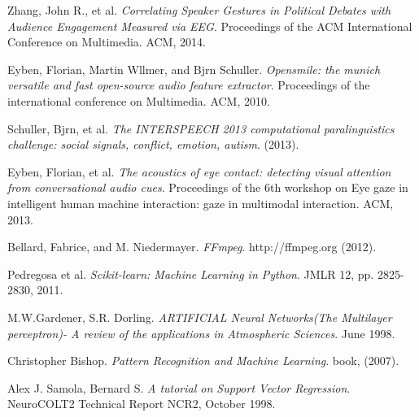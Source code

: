 \begin{thebibliography}{9}
Zhang, John R., et al.
\textit{Correlating Speaker Gestures in Political Debates with Audience Engagement Measured via EEG}. 
Proceedings of the ACM International Conference on Multimedia. ACM, 2014.

Eyben, Florian, Martin Wllmer, and Bjrn Schuller.
\textit{Opensmile: the munich versatile and fast open-source audio feature extractor}. 
Proceedings of the international conference on Multimedia. ACM, 2010.

Schuller, Bjrn, et al.
\textit{The INTERSPEECH 2013 computational paralinguistics challenge: social signals, conflict, emotion, autism}. 
(2013).

Eyben, Florian, et al.
\textit{The acoustics of eye contact: detecting visual attention from conversational audio cues}. 
Proceedings of the 6th workshop on Eye gaze in intelligent human machine interaction: gaze in multimodal interaction. ACM, 2013.

Bellard, Fabrice, and M. Niedermayer.
\textit{FFmpeg}. 
http://ffmpeg.org (2012).

Pedregosa et al.
\textit{Scikit-learn: Machine Learning in Python}. 
JMLR 12, pp. 2825-2830, 2011.

M.W.Gardener, S.R. Dorling.
\textit{ARTIFICIAL Neural Networks(The Multilayer perceptron)- A review of the applications in Atmospheric Sciences}. 
June 1998.

Christopher Bishop.
\textit{Pattern Recognition and Machine Learning}. 
book, (2007).

Alex J. Samola, Bernard S.
\textit{A tutorial on Support Vector Regression}. 
NeuroCOLT2 Technical Report NCR2, October 1998.

\end{thebibliography}

%

